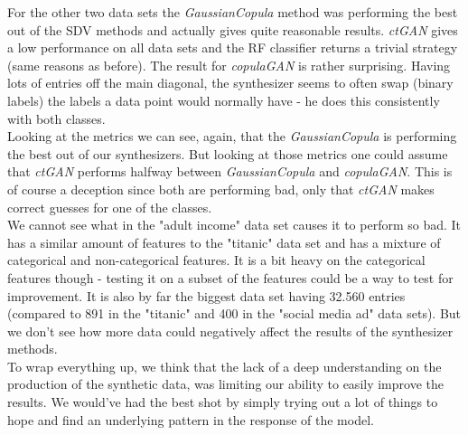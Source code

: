 \documentclass{article}
\begin{document}
For the other two data sets the \textit{GaussianCopula} method was performing the best out of the SDV methods and actually gives quite reasonable results. \textit{ctGAN} gives a low performance on all data sets and the RF classifier returns a trivial strategy (same reasons as before). The result for \textit{copulaGAN} is rather surprising. Having lots of entries off the main diagonal, the synthesizer seems to often swap (binary labels) the labels a data point would normally have - he does this consistently with both classes. \\

Looking at the metrics we can see, again, that the \textit{GaussianCopula} is performing the best out of our synthesizers. But looking at those metrics one could assume that \textit{ctGAN} performs halfway between \textit{GaussianCopula} and \textit{copulaGAN}. This is of course a deception since both are performing bad, only that \textit{ctGAN} makes correct guesses for one of the classes. \\

We cannot see what in the "adult income" data set causes it to perform so bad. It has a similar amount of features to the "titanic" data set and has a mixture of categorical and non-categorical features. It is a bit heavy on the categorical features though - testing it on a subset of the features could be a way to test for improvement. It is also by far the biggest data set having 32.560 entries (compared to 891 in the "titanic" and 400 in the "social media ad" data sets). But we don't see how more data could negatively affect the results of the synthesizer methods. \\

To wrap everything up, we think that the lack of a deep understanding on the production of the synthetic data, was limiting our ability to easily improve the results. We would've had the best shot by simply trying out a lot of things to hope and find an underlying pattern in the response of the model.

\clearpage
{}

\end{document}
